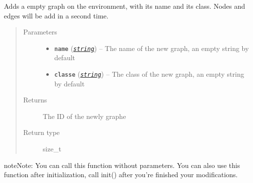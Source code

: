 \documentclass[letterpaper,10pt,english]{sphinxmanual}
\begin{document}
\begin{fulllineitems}
\label{doc:gedlibpy.add_graph}
Adds a empty graph on the environment, with its name and its class. Nodes and edges will be add in a second time.
\begin{quote}\begin{description}
\item[{Parameters}] \leavevmode\begin{itemize}
\item {} 
\textbf{\texttt{name}} (\href{https://docs.python.org/3/library/string.html\#module-string}{\emph{\texttt{string}}}) -- The name of the new graph, an empty string by default

\item {} 
\textbf{\texttt{classe}} (\href{https://docs.python.org/3/library/string.html\#module-string}{\emph{\texttt{string}}}) -- The class of the new graph, an empty string by default

\end{itemize}

\item[{Returns}] \leavevmode
The ID of the newly graphe

\item[{Return type}] \leavevmode
size\_t

\end{description}\end{quote}

\begin{notice}{note}{Note:}
You can call this function without parameters. You can also use this function after initialization, call init() after you're finished your modifications.
\end{notice}

\end{fulllineitems}

\end{document}
